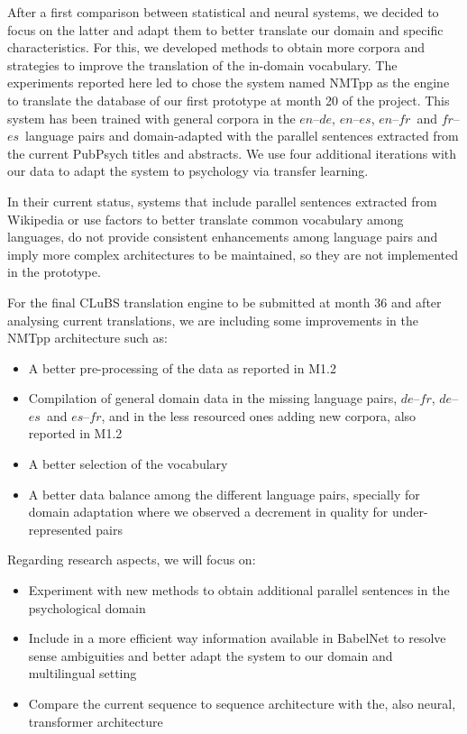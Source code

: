 \documentclass[a4paper,11pt]{article}
\newcommand{\en}{$en$}
\newcommand{\es}{$es$}
\newcommand{\fr}{$fr$}
\newcommand{\de}{$de$}
\begin{document}
After a first comparison between statistical and neural systems, we decided to focus on the latter and adapt them to better translate our domain and specific characteristics. For this, we developed methods to obtain more corpora and strategies to improve the translation of the in-domain vocabulary. The experiments reported here led to chose the system named NMTpp as the engine to translate the database of our first prototype at month 20 of the project. This system has been trained with general corpora in the  \en--\de, \en--\es, \en--\fr\ and \fr--\es\ language pairs and domain-adapted with the parallel sentences extracted from the current PubPsych titles and abstracts. We use four additional iterations with our data to adapt the system to psychology via transfer learning. 

In their current status, systems that include parallel sentences extracted from Wikipedia or use factors to better translate common vocabulary among languages, do not provide consistent enhancements among language pairs and imply more complex architectures to be maintained, so they are not implemented in the prototype.

\medskip
For the final CLuBS translation engine to be submitted at month 36 and after analysing current translations, we are including some improvements in the NMTpp architecture such as:
\begin{itemize}
 \setlength\itemsep{0.2em}
 \item A better pre-processing of the data as reported in M1.2
 \item Compilation of general domain data in the missing language pairs, \de--\fr, \de--\es\ and \es--\fr, and in the less resourced ones adding new corpora, also reported in M1.2
 \item A better selection of the vocabulary
 \item A better data balance among the different language pairs, specially for domain adaptation where we observed a decrement in quality for under-represented pairs
\end{itemize}

\medskip
\noindent
Regarding research aspects, we will focus on:
\begin{itemize}
 \setlength\itemsep{0.2em}
 \item Experiment with new methods to obtain additional parallel sentences in the psychological domain 
 \item Include in a more efficient way information available in BabelNet to resolve sense ambiguities and better adapt the system to our domain and multilingual setting
 \item Compare the current sequence to sequence architecture with the, also neural, transformer architecture
\end{itemize}


%
%


\end{document}
